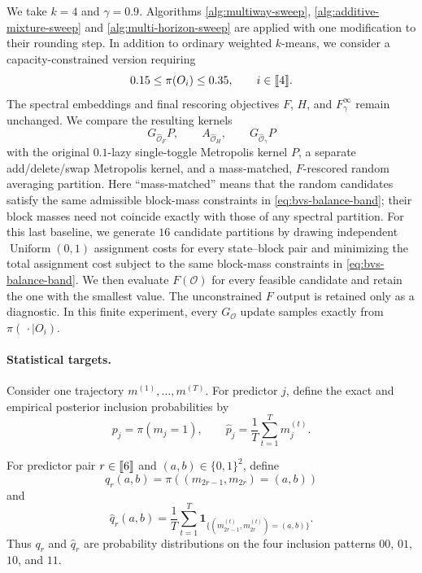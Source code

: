 \documentclass[11pt]{article}
\newcommand{\1}{\mathbf{1}}
\providecommand{\llbracket}{\mathopen{[\mkern-2.7mu[}}
\providecommand{\rrbracket}{\mathclose{]\mkern-2.7mu]}}
\begin{document}
We take $k=4$ and $\gamma=0.9$.  Algorithms
\ref{alg:multiway-sweep}, \ref{alg:additive-mixture-sweep} and \ref{alg:multi-horizon-sweep} are applied
with one modification to their rounding step.  In addition to ordinary
weighted $k$-means, we consider a capacity-constrained version
requiring
\begin{equation}
	0.15\leq\pi(O_i)\leq0.35,
	\qquad i\in\llbracket 4\rrbracket.
	\label{eq:bvs-balance-band}
\end{equation}
The spectral embeddings and final rescoring objectives $F$, $H$, and
$F_\gamma^\infty$ remain unchanged. We compare the resulting kernels
\[
G_{\widehat{\mathcal O}_F}P,\qquad
A_{\widehat{\mathcal O}_H},\qquad
G_{\widehat{\mathcal O}_\gamma}P
\]
with the original $0.1$-lazy single-toggle Metropolis kernel $P$, a
separate add/delete/swap Metropolis kernel, and a mass-matched,
$F$-rescored random averaging partition. Here ``mass-matched'' means that the random candidates satisfy the
same admissible block-mass constraints in
\eqref{eq:bvs-balance-band}; their block masses need not coincide
exactly with those of any spectral partition. For this last baseline, we
generate $16$ candidate partitions by drawing independent
$\operatorname{Uniform}(0,1)$ assignment costs for every state--block
pair and minimizing the total assignment cost subject to the same
block-mass constraints in \eqref{eq:bvs-balance-band}.  We then
evaluate $F(\mathcal O)$ for every feasible candidate and retain the
one with the smallest value.  The unconstrained $F$ output is retained
only as a diagnostic.  In this finite experiment, every
$G_{\mathcal O}$ update samples exactly from
$\pi(\,\cdot\mid O_i)$.

\paragraph{Statistical targets.}
Consider one trajectory
$m^{(1)},\ldots,m^{(T)}$.  For predictor $j$, define the exact and
empirical posterior inclusion probabilities by
\[
    p_j=\pi(m_j=1),
    \qquad
    \widehat p_j
    =\frac{1}{T}\sum_{t=1}^T m_j^{(t)}.
\]

For predictor pair $r\in\llbracket 6\rrbracket$ and
$(a,b)\in \{0,1\}^2$, define
\[
    q_r(a,b)
    =
    \pi\!\left(
        (m_{2r-1},m_{2r})=(a,b)
    \right)
\]
and
\[
    \widehat q_r(a,b)
    =
    \frac{1}{T}\sum_{t=1}^T
    \1_{\{
        (m_{2r-1}^{(t)},m_{2r}^{(t)})=(a,b)
    \}}.
\]
Thus $q_r$ and $\widehat q_r$ are probability distributions on the
four inclusion patterns $00$, $01$, $10$, and $11$.
\end{document}
